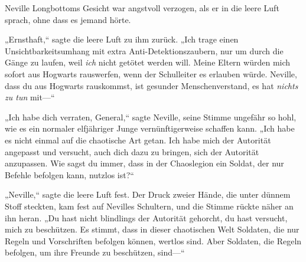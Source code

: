 Neville Longbottoms Gesicht war angstvoll verzogen, als er in die leere Luft sprach, ohne dass es jemand hörte.

„Ernsthaft,“ sagte die leere Luft zu ihm zurück. „Ich trage einen Unsichtbarkeitsumhang mit extra Anti-Detektionszaubern, nur um durch die Gänge zu laufen, weil \emph{ich} nicht getötet werden will. Meine Eltern würden mich sofort aus Hogwarts rauswerfen, wenn der Schulleiter es erlauben würde. Neville, dass du aus Hogwarts rauskommst, ist gesunder Menschenverstand, es hat \emph{nichts zu tun} mit—“

„Ich habe dich verraten, General,“ sagte Neville, seine Stimme ungefähr so hohl, wie es ein normaler elfjähriger Junge vernünftigerweise schaffen kann. „Ich habe es nicht einmal auf die chaotische Art getan. Ich habe mich der Autorität angepasst und versucht, auch dich dazu zu bringen, sich der Autorität anzupassen. Wie sagst du immer, dass in der Chaoslegion ein Soldat, der nur Befehle befolgen kann, nutzlos ist?“

„Neville,“ sagte die leere Luft fest. Der Druck zweier Hände, die unter dünnem Stoff steckten, kam fest auf Nevilles Schultern, und die Stimme rückte näher an ihn heran. „Du hast nicht blindlings der Autorität gehorcht, du hast versucht, mich zu beschützen. Es stimmt, dass in dieser chaotischen Welt Soldaten, die nur Regeln und Vorschriften befolgen können, wertlos sind. Aber Soldaten, die Regeln befolgen, um ihre Freunde zu beschützen, sind—“

